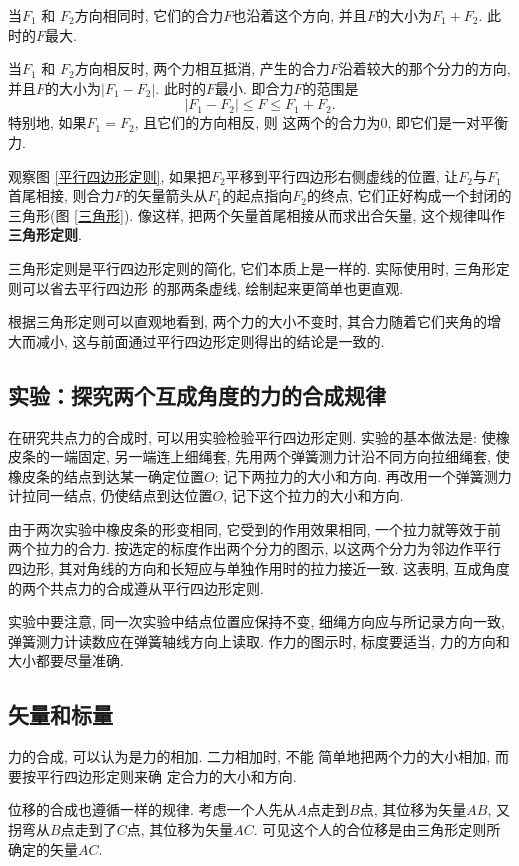 \documentclass[11pt,a4paper]{ctexbook}
\begin{document}
当$F_1$ 和 $F_2$方向相同时, 它们的合力$F$也沿着这个方向, 并且$F$的大小为$F_1+F_2$. 此时的$F$最大.

当$F_1$ 和 $F_2$方向相反时, 两个力相互抵消, 产生的合力$F$沿着较大的那个分力的方向,
并且$F$的大小为$|F_1-F_2|$. 此时的$F$最小. 即合力$F$的范围是
$$|F_1 - F_2| \leqslant F \leqslant F_1 + F_2.$$
特别地, 如果$F_1 = F_2$, 且它们的方向相反, 则
这两个的合力为0, 即它们是一对平衡力.

观察图 \ref{平行四边形定则}, 如果把$F_2$平移到平行四边形右侧虚线的位置, 让$F_2$与$F_1$首尾相接,
则合力$F$的矢量箭头从$F_1$的起点指向$F_2$的终点, 它们正好构成一个封闭的三角形(图 \ref{三角形}). 像这样,
把两个矢量首尾相接从而求出合矢量, 这个规律叫作\textbf{三角形定则}.

三角形定则是平行四边形定则的简化, 它们本质上是一样的. 实际使用时, 三角形定则可以省去平行四边形
的那两条虚线, 绘制起来更简单也更直观.

根据三角形定则可以直观地看到, 两个力的大小不变时, 其合力随着它们夹角的增大而减小, 这与前面通过平行四边形定则得出的结论是一致的.



\subsection{实验：探究两个互成角度的力的合成规律}

在研究共点力的合成时, 可以用实验检验平行四边形定则. 实验的基本做法是: 使橡皮条的一端固定, 另一端连上细绳套, 先用两个弹簧测力计沿不同方向拉细绳套, 使橡皮条的结点到达某一确定位置$O$; 记下两拉力的大小和方向. 再改用一个弹簧测力计拉同一结点, 仍使结点到达位置$O$, 记下这个拉力的大小和方向.

由于两次实验中橡皮条的形变相同, 它受到的作用效果相同, 一个拉力就等效于前两个拉力的合力. 按选定的标度作出两个分力的图示, 以这两个分力为邻边作平行四边形, 其对角线的方向和长短应与单独作用时的拉力接近一致. 这表明, 互成角度的两个共点力的合成遵从平行四边形定则.

实验中要注意, 同一次实验中结点位置应保持不变, 细绳方向应与所记录方向一致, 弹簧测力计读数应在弹簧轴线方向上读取. 作力的图示时, 标度要适当, 力的方向和大小都要尽量准确.

\subsection{矢量和标量}
力的合成, 可以认为是力的相加. 二力相加时, 不能
简单地把两个力的大小相加, 而要按平行四边形定则来确
定合力的大小和方向.

位移的合成也遵循一样的规律. 考虑一个人先从$A$点走到$B$点, 其位移为矢量$AB$, 又拐弯从$B$点走到了$C$点, 其位移为矢量$AC$.
可见这个人的合位移是由三角形定则所确定的矢量$AC$.
\end{document}

